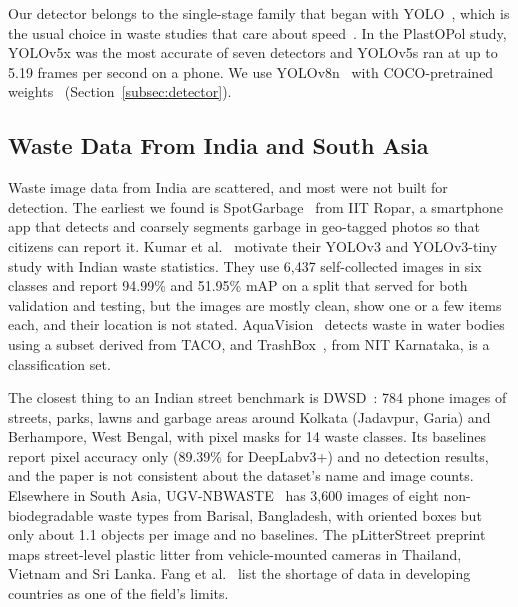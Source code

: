 Our detector belongs to the single-stage family that began with YOLO~\cite{redmon2016you}, which is the usual choice in waste studies that care about speed~\cite{kumar2021novel,kraft2021autonomous,liao2022realtime,cordova2022litter}. In the PlastOPol study, YOLOv5x was the most accurate of seven detectors and YOLOv5s ran at up to 5.19 frames per second on a phone. We use YOLOv8n~\cite{jocher2023ultralytics} with COCO-pretrained weights~\cite{lin2014microsoft} (Section~\ref{subsec:detector}).

\subsection{Waste Data From India and South Asia}
\label{subsec:rw-india}

Waste image data from India are scattered, and most were not built for detection. The earliest we found is SpotGarbage~\cite{mittal2016spotgarbage} from IIT Ropar, a smartphone app that detects and coarsely segments garbage in geo-tagged photos so that citizens can report it. Kumar et al.~\cite{kumar2021novel} motivate their YOLOv3 and YOLOv3-tiny study with Indian waste statistics. They use 6,437 self-collected images in six classes and report 94.99\% and 51.95\% mAP on a split that served for both validation and testing, but the images are mostly clean, show one or a few items each, and their location is not stated. AquaVision~\cite{panwar2020aquavision} detects waste in water bodies using a subset derived from TACO, and TrashBox~\cite{kumsetty2022trashbox}, from NIT Karnataka, is a classification set.

The closest thing to an Indian street benchmark is DWSD~\cite{ali2025dwsd}: 784 phone images of streets, parks, lawns and garbage areas around Kolkata (Jadavpur, Garia) and Berhampore, West Bengal, with pixel masks for 14 waste classes. Its baselines report pixel accuracy only (89.39\% for DeepLabv3+) and no detection results, and the paper is not consistent about the dataset's name and image counts. Elsewhere in South Asia, UGV-NBWASTE~\cite{isalm2025ugvnbwaste} has 3,600 images of eight non-biodegradable waste types from Barisal, Bangladesh, with oriented boxes but only about 1.1 objects per image and no baselines. The pLitterStreet preprint~\cite{mandhati2024plitterstreet} maps street-level plastic litter from vehicle-mounted cameras in Thailand, Vietnam and Sri Lanka. Fang et al.~\cite{fang2023artificial} list the shortage of data in developing countries as one of the field's limits.

